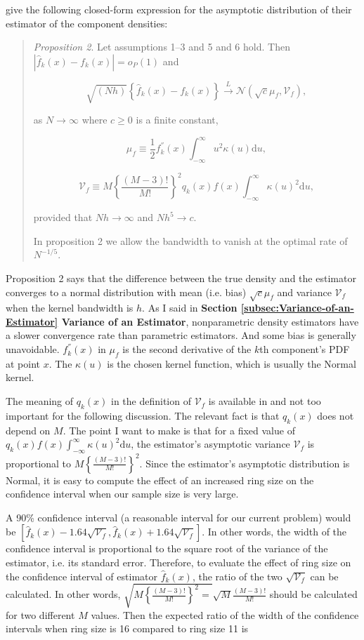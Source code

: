 \documentclass[english]{article}
\begin{document}
\cite{Bonhomme2016} give the following closed-form expression for
the asymptotic distribution of their estimator of the component densities:
\begin{quote}
\textit{Proposition 2}. Let assumptions 1--3 and 5 and 6 hold. Then
$|\hat{f}_{k}(x)-f_{k}(x)|=o_{P}(1)$ and

\[
\sqrt{(Nh)}\left\{ \hat{f}_{k}(x)-f_{k}(x)\right\} \overset{L}{\rightarrow}\mathcal{N}\left(\sqrt{c}\mu_{f},\mathscr{V}_{f}\right),
\]

as $N\rightarrow\infty$ where $c\geqslant0$ is a finite constant,

\[
\mu_{f}\equiv\frac{1}{2}f_{k}^{''}(x)\int_{-\infty}^{\infty}u^{2}\kappa(u)\mathrm{d}u,
\]

\[
\mathscr{V}_{f}\equiv M\left\{ \frac{(M-3)!}{M!}\right\} ^{2}q_{k}(x)f(x)\int_{-\infty}^{\infty}\kappa(u)^{2}\mathrm{d}u,
\]

provided that $Nh\rightarrow\infty$ and $Nh^{5}\rightarrow c$.

In proposition 2 we allow the bandwidth to vanish at the optimal rate
of $N^{-1/5}$.
\end{quote}
Proposition 2 says that the difference between the true density and
the estimator converges to a normal distribution with mean (i.e. bias)
$\sqrt{c}\mu_{f}$ and variance $\mathscr{V}_{f}$ when the kernel
bandwidth is $h$. As I said in \textbf{Section \ref{subsec:Variance-of-an-Estimator}
Variance of an Estimator}, nonparametric density estimators have a
slower convergence rate than parametric estimators. And some bias
is generally unavoidable. $f_{k}^{''}(x)$ in $\mu_{f}$ is the second
derivative of the $k$th component's PDF at point $x$. The $\kappa(u)$
is the chosen kernel function, which is usually the Normal kernel.

The meaning of $q_{k}(x)$ in the definition of $\mathscr{V}_{f}$
is available in \cite{Bonhomme2016} and not too important for the
following discussion. The relevant fact is that $q_{k}(x)$ does not
depend on $M$. The point I want to make is that for a fixed value
of $q_{k}(x)f(x)\int_{-\infty}^{\infty}\kappa(u)^{2}\mathrm{d}u$,
the estimator's asymptotic variance $\mathscr{V}_{f}$ is proportional
to $M\left\{ \frac{(M-3)!}{M!}\right\} ^{2}$. Since the estimator's
asymptotic distribution is Normal, it is easy to compute the effect
of an increased ring size on the confidence interval when our sample
size is very large.

A 90\% confidence interval (a reasonable interval for our current
problem) would be $\left[\hat{f}_{k}(x)-1.64\sqrt{\mathscr{V}_{f}},\hat{f}_{k}(x)+1.64\sqrt{\mathscr{V}_{f}}\right]$.
In other words, the width of the confidence interval is proportional
to the square root of the variance of the estimator, i.e. its standard
error. Therefore, to evaluate the effect of ring size on the confidence
interval of estimator $\hat{f}_{k}(x)$, the ratio of the two $\sqrt{\mathscr{V}_{f}}$
can be calculated. In other words, $\sqrt{M\left\{ \frac{(M-3)!}{M!}\right\} ^{2}=}\sqrt{M}\frac{(M-3)!}{M!}$
should be calculated for two different $M$ values. Then the expected
ratio of the width of the confidence intervals when ring size is 16
compared to ring size 11 is
\end{document}
